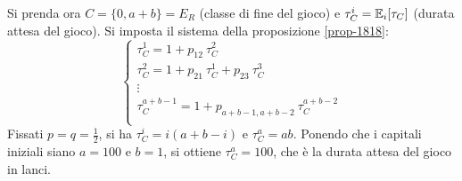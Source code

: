 \begin{ese}
	Si prenda ora $C = \{0,a+b\} = E_R$ (classe di fine del gioco) e $\tau_C^i = \mathbb E_i[\tau_C]$ (durata attesa del gioco).
	Si imposta il sistema della proposizione \ref{prop-1818}:
	$$\begin{cases}
	\tau_C^1 = 1 + p_{12} \ \tau_C^2 \\
	\tau_C^2 = 1 + p_{21} \ \tau_C^1 + p_{23} \ \tau_C^3 \\
	\vdots \\
	\tau_C^{a+b-1} = 1 + p_{a+b-1, a+b-2} \ \tau_C^{a+b-2} \\
	\end{cases}$$
	Fissati $p=q=\frac 1 2$, si ha $\tau_C^i = i(a+b-i)$ e $\tau_C^a = ab$.
	Ponendo che i capitali iniziali siano $a=100$ e $b=1$, si ottiene $\tau_C^a = 100$,
	che è la durata attesa del gioco in lanci.
\end{ese}

